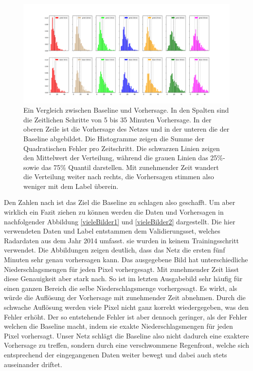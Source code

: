 \begin{figure}[h]
	\includegraphics[width=\linewidth]{pics/35min_vgl_baseline.png}
	\caption[Vergleich zwischen Baseline und UNet (35 Minuten Vorhersage)]{Ein Vergleich zwischen Baseline und Vorhersage. In den Spalten sind die Zeitlichen Schritte von 5 bis 35 Minuten Vorhersage. In der oberen Zeile ist die Vorhersage des Netzes und in der unteren die der Baseline abgebildet. Die Histogramme zeigen die Summe der Quadratischen Fehler pro Zeitschritt. Die schwarzen Linien zeigen den Mittelwert der Verteilung, während die grauen Linien das 25\%- sowie das 75\% Quantil darstellen. Mit zunehmender Zeit wandert die Verteilung weiter nach rechts, die Vorhersagen stimmen also weniger mit dem Label überein.}
	\label{35vglbasepred}
\end{figure}

Den Zahlen nach ist das Ziel die Baseline zu schlagen also geschafft. Um aber wirklich ein Fazit ziehen zu können werden die Daten und Vorhersagen in nachfolgender Abbildung \ref{vieleBilder1} und \ref{vieleBilder2} dargestellt.
Die hier verwendeten Daten und Label entstammen dem Validierungsset, welches Radardaten aus dem Jahr 2014 umfasst. sie wurden in keinem Trainingsschritt verwendet.
Die Abbildungen zeigen deutlich, dass das Netz die ersten fünf Minuten sehr genau vorhersagen kann. Das ausgegebene Bild hat unterschiedliche Niederschlagsmengen für jeden Pixel vorhergesagt. Mit zunehmender Zeit lässt diese Genauigkeit aber stark nach. So ist im letzten Ausgabebild sehr häufig für einen ganzen Bereich die selbe Niederschlagsmenge vorhergesagt. Es wirkt, als würde die Auflösung der Vorhersage mit zunehmender Zeit abnehmen. Durch die schwache Auflösung werden viele Pixel nicht ganz korrekt wiedergegeben, was den Fehler erhöht. Der so entstehende Fehler ist aber dennoch geringer, als der Fehler welchen die Baseline macht, indem sie exakte Niederschlagsmengen für jeden Pixel vorhersagt. Unser Netz schlägt die Baseline also nicht dadurch eine exaktere Vorhersage zu treffen, sondern durch eine verschwommene Regenfront, welche sich entsprechend der eingegangenen Daten weiter bewegt und dabei auch stets auseinander driftet.


